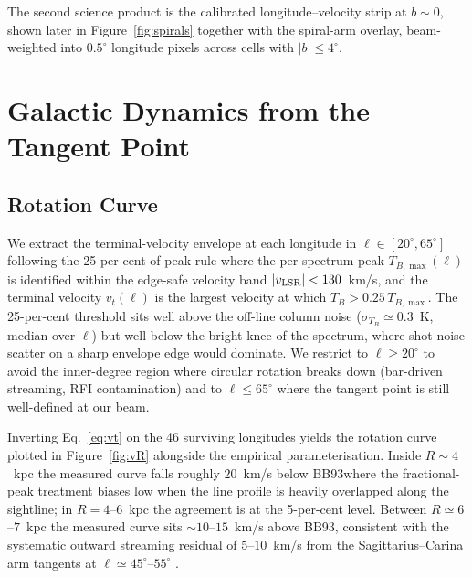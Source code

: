 \documentclass[10pt,preprint2]{aastex}
\begin{document}
The second science product is the calibrated longitude--velocity strip at $b\sim 0$, shown later in Figure~\ref{fig:spirals} together with the spiral-arm overlay, beam-weighted into $0.5^\circ$ longitude pixels across cells with $|b|\le 4^\circ$. 

\section{Galactic Dynamics from the Tangent Point}
\label{sec:dynamics}

\subsection{Rotation Curve}
\label{sec:rotation_curve}

We extract the terminal-velocity envelope at each longitude in $\ell\in[20^\circ, 65^\circ]$ following the \citet{Burton1988} 25-per-cent-of-peak rule where the per-spectrum peak $T_{B,\max}(\ell)$ is identified within the edge-safe velocity band $|v_{\rm LSR}|<130$~km/s, and the terminal velocity $v_t(\ell)$ is the largest velocity at which $T_B > 0.25\,T_{B,\max}$. The 25-per-cent threshold sits well above the off-line column noise ($\sigma_{T_B} \simeq 0.3$~K, median over $\ell$) but well below the bright knee of the spectrum, where shot-noise scatter on a sharp envelope edge would dominate. We restrict to $\ell\ge 20^\circ$ to avoid the inner-degree region where circular rotation breaks down (bar-driven streaming, RFI contamination) and to $\ell \le 65^\circ$ where the tangent point is still well-defined at our beam.

Inverting Eq.~\eqref{eq:vt} on the 46 surviving longitudes yields the rotation curve plotted in Figure~\ref{fig:vR} alongside the empirical \citet{BrandBlitz1993} parameterisation. Inside $R\sim 4$~kpc the measured curve falls roughly $20$~km/s below BB93where the fractional-peak treatment biases low when the line profile is heavily overlapped along the sightline; in $R = 4$--$6$~kpc the agreement is at the 5-per-cent level. Between $R \simeq 6$--$7$~kpc the measured curve sits $\sim 10$--$15$~km/s above BB93, consistent with the systematic outward streaming residual of $5$--$10$~km/s from the Sagittarius--Carina arm tangents at $\ell \simeq 45^\circ$--$55^\circ$ \citep{Reid2014}.
\end{document}
